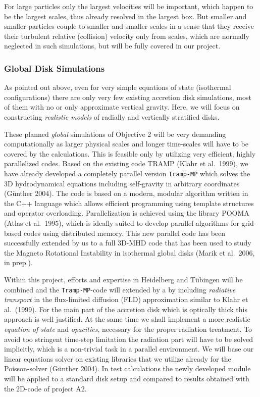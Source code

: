 For large particles only the largest velocities will be important, which
happen to be the largest scales, thus already resolved in the largest
box. But smaller and smaller particles couple to smaller and smaller scales
in a sense that they receive their turbulent relative (collision) velocity
only from scales, which are normally neglected in such simulations, but will
be fully covered in our project.

%
\subsubsection{Global Disk Simulations}
%
As pointed out above, even for very simple equations of state (isothermal
configurations) there are only very few existing accretion disk simulations,
most of them with no or only approximate vertical gravity.  Here, we will
focus on constructing {\it realistic models} of radially and vertically
stratified disks.

These planned {\em global} simulations of Objective 2 will be very demanding
computationally as larger physical scales and longer time-scales will have
to be covered by the calculations.  This is feasible only by utilizing very
efficient, highly parallelized codes.  Based on the existing code TRAMP
(Klahr et al.\ 1999), we have already developed a completely parallel
version {\tt Tramp-MP} which solves the 3D hydrodynamical equations
including self-gravity in arbitrary coordinates (G\"unther 2004).  The code
is based on a modern, modular algorithm written in the C++ language which
allows efficient programming using template structures and operator
overloading.  Parallelization is achieved using the library POOMA (Atlas et
al.\ 1995), which is ideally suited to develop parallel algorithms for
grid-based codes using distributed memory.  This new parallel code has been
successfully extended by us to a full 3D-MHD code that has been used to
study the Magneto Rotational Instability in isothermal global disks (Marik
et al.\ 2006, in prep.).

Within this project, efforts and expertise in Heidelberg and T\"ubingen will
be combined and the {\tt Tramp-MP}-code will extended by a by including {\it
radiative transport} in the flux-limited diffusion (FLD) approximation
similar to Klahr et al.\ (1999).  For the main part of the accretion disk
which is optically thick this approach is well justified.  At the same time
we shall implement a more realistic {\it equation of state} and {\it
opacities}, necessary for the proper radiation treatment.  To avoid too
stringent time-step limitation the radiation part will have to be solved
implicitly, which is a non-trivial task in a parallel environment. We will
base our linear equations solver on existing libraries that we utilize
already for the Poisson-solver (G\"unther 2004).  In test calculations the
newly developed module will be applied to a standard disk setup and compared
to results obtained with the 2D-code of project A2.

